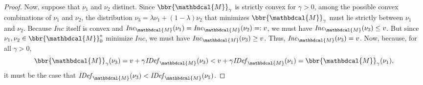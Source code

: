\documentclass{article}
\theoremstyle{plain}
\theoremstyle{definition}
\theoremstyle{remark}
\newcommand{\dg}[1]{\mathbdcal{#1}}
\newcommand{\IDef}[1]{\mathit{IDef}_{#1}}
\newcommand\Inc{\mathit{Inc}}
\numberwithin{equation}{section}
\begin{document}
\begin{proof}
Now, suppose that $\nu_1$ and $\nu_2$ distinct. Since $\bbr{\dg M}_\gamma$
is strictly convex for $\gamma > 0$, among the possible convex
combinations of $\nu_1$ and $\nu_2$, the distribution $\nu_3 = \lambda
\nu_1 + (1-\lambda) \nu_2$ that minimizes $\bbr{\dg M}_\gamma$ must
lie strictly between $\nu_1$ and $\nu_2$. 
Because $\Inc$ itself is convex and $\Inc_{\dg M}(\nu_1) = \Inc_{\dg
  M}(\nu_2) =: v$, we must have $\Inc_{\dg M}(\nu_3) \le v$. 
But since
$\nu_1,\nu_2 \in \bbr{\dg M}_0^*$ minimize $\Inc$,
we must have $\Inc_{\dg M}(\nu_3) \ge v$.
Thus, $\Inc_{\dg M}(\nu_3) = v$. 
Now, because, for all  $\gamma > 0$,
\[ \bbr{\dg M}_\gamma(\nu_3) = v + \gamma \IDef{\dg M}(\nu_3) 
 	< v + \gamma \IDef{\dg M}(\nu_1) = \bbr{\dg M}_\gamma(\nu_1), \] 
it must be the case that $\IDef{\dg M}(\nu_3) < \IDef{\dg M}(\nu_1)$. 
        

\end{proof}
\end{document}
